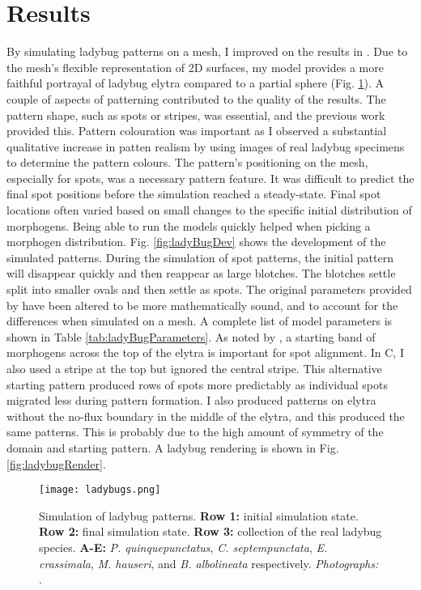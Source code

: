\section{Results}
By simulating ladybug patterns on a mesh, I improved on the results in \citep{liaw2001}. Due to the mesh's flexible representation of 2D surfaces, my model provides a more faithful portrayal of ladybug elytra compared to a partial sphere (Fig. \ref{fig:ladyBugPatterns}). A couple of aspects of patterning contributed to the quality of the results. The pattern shape, such as spots or stripes, was essential, and the previous work provided this. Pattern colouration was important as I observed a substantial qualitative increase in patten realism by using images of real ladybug specimens to determine the pattern colours. The pattern's positioning on the mesh, especially for spots, was a necessary pattern feature. It was difficult to predict the final spot positions before the simulation reached a steady-state. Final spot locations often varied based on small changes to the specific initial distribution of morphogens. Being able to run the models quickly helped when picking a morphogen distribution. Fig. \ref{fig:ladyBugDev} shows the development of the simulated patterns. During the simulation of spot patterns, the initial pattern will disappear quickly and then reappear as large blotches. The blotches settle split into smaller ovals and then settle as spots. The original parameters provided by \citet{liaw2001} have been altered to be more mathematically sound, and to account for the differences when simulated on a mesh. A complete list of model parameters is shown in Table \ref{tab:ladyBugParameters}. As noted by \citet{liaw2001}, a starting band of morphogens across the top of the elytra is important for spot alignment. In C, I also used a stripe at the top but ignored the central stripe. This alternative starting pattern produced rows of spots more predictably as individual spots migrated less during pattern formation. I also produced patterns on elytra without the no-flux boundary in the middle of the elytra, and this produced the same patterns. This is probably due to the high amount of symmetry of the domain and starting pattern. A ladybug rendering is shown in Fig. \ref{fig:ladybugRender}.

\begin{figure}[ht]
	\centering
	\texttt{[image: ladybugs.png]}
	\caption[Simulation of ladybug patterns]{Simulation of ladybug patterns. \textbf{Row 1:} initial simulation state. \textbf{Row 2:} final simulation state. \textbf{Row 3:} collection of the real ladybug species. \textbf{A-E:} \textit{P. quinquepunctatus}, \textit{C. septempunctata}, \textit{E. crassimala}, \textit{M. hauseri}, and \textit{B. albolineata} respectively. 
	 \textit{Photographs: \citep{chen2008}}.}
	\label{fig:ladyBugPatterns}
\end{figure}

